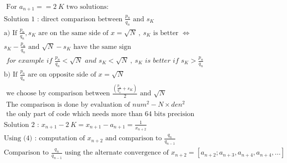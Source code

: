 \documentclass[10pt,a4paper]{letter}
\begin{document}
	

\begin{align*}
& \text{ For }a_{n+1}==2\ K \text{ two solutions: } \\
& \text {Solution 1 : direct comparison between } \frac{p_{n}}{q_{n}} \text{ and } s_{K}\\
& \text {a) If }\frac{p_{n}}{q_{n}} , s_{K} \text { are on the same side of }x=\sqrt{N} \ ,\  s_{K} \text{ is better }\Leftrightarrow\\
& s_{K}-\frac{p_{n}}{q_{n}} \text{ and } \sqrt{N}-s_{K} \text{ have the same sign }
\\
& \textit{ for example if } \frac{p_{n}}{q_{n}}<\sqrt{N} \textit { and } s_{K}<\sqrt{N}\ ,\ s_{K} \textit { is better if }s_{K}>\frac{p_{n}}{q_{n}}\\
&\text {b) If }\frac{p_{n}}{q_{n}}  \text { are on opposite side of }x=\sqrt{N} \\
& \text{ we choose by comparison between }\frac{(\frac{p_{n}}{q_{n}}+s_{K} )}{2} \text { and }\sqrt{N} \\
&\text { The comparison is done by evaluation of }num^{2}-N\times den^{2}\\
& \text{ the only part of code which needs more than 64 bits precision}
\\
& \text {Solution 2 : }x_{n+1}-2\  K=x_{n+1}-a_{n+1}=\frac{1}{x_{n+2}}\\
&\text{Using (4) : computation of }x_{n+2} \text{ and comparison to }\frac{q_{n}}{q_{n-1}}\\
&\text{Comparison to }\frac{q_{n}}{q_{n-1}} \text{ using the alternate convergence of }x_{n+2}=[a_{n+2};a_{n+3},a_{n+4},a_{n+4},...]
\end{align*}  
\end{document}
